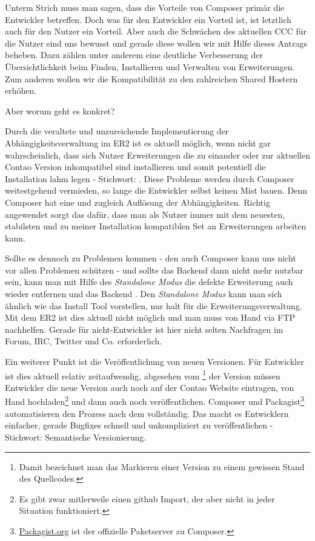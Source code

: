 \documentclass[
paper=a4,
draft=false,%
fontsize=10pt%
]{scrartcl}
\begin{document}
Unterm Strich muss man sagen, dass die Vorteile von Composer primär die Entwickler betreffen. Doch was für den Entwickler ein Vorteil ist, ist letztlich auch für den Nutzer ein Vorteil. Aber auch die Schwächen des aktuellen CCC für die Nutzer sind uns bewusst und gerade diese wollen wir mit Hilfe dieses Antrags beheben. Dazu zählen unter anderem eine deutliche Verbesserung der Übersichtlichkeit beim Finden, Installieren und Verwalten von Erweiterungen. Zum anderen wollen wir die Kompatibilität zu den zahlreichen Shared Hostern erhöhen.

Aber worum geht es konkret?

Durch die veraltete und unzureichende Implementierung der Abhängigkeitsverwaltung im ER2 ist es aktuell möglich, wenn nicht gar wahrscheinlich, dass sich Nutzer Erweiterungen die zu einander oder zur aktuellen Contao Version inkompatibel sind installieren und somit potentiell die Installation lahm legen - Stichwort: . Diese Probleme werden durch Composer weitestgehend vermieden, so lange die Entwickler selbst keinen Mist bauen. Denn Composer hat eine  und zugleich  Auflösung der Abhängigkeiten. Richtig angewendet sorgt das dafür, dass man als Nutzer immer mit dem neuesten, stabilsten und zu meiner Installation kompatiblen Set an Erweiterungen arbeiten kann.

Sollte es dennoch zu Problemen kommen - den auch Composer kann uns nicht vor allen Problemen schützen - und sollte das Backend dann nicht mehr nutzbar sein, kann man mit Hilfe des \textit{Standalone Modus} die defekte Erweiterung auch wieder entfernen und das Backend . Den \textit{Standalone Modus} kann man sich ähnlich wie das Install Tool vorstellen, nur halt für die Erweiterungsverwaltung. Mit dem ER2 ist dies aktuell nicht möglich und man muss von Hand via FTP nachhelfen. Gerade für nicht-Entwickler ist hier nicht selten Nachfragen im Forum, IRC, Twitter und Co. erforderlich.

Ein weiterer Punkt ist die Veröffentlichung von neuen Versionen. Für Entwickler ist dies aktuell relativ zeitaufwendig, abgesehen vom \footnote{Damit bezeichnet man das Markieren einer Version zu einem gewissen Stand des Quellcodes.} der Version müssen Entwickler die neue Version auch noch auf der Contao Website eintragen, von Hand hochladen\footnote{Es gibt zwar mitlerweile einen github Import, der aber nicht in jeder Situation funktioniert.} und dann auch noch veröffentlichen. Composer und Packagist\footnote{\href{https://packagist.org}{Packagist.org} ist der offizielle Paketserver zu Composer.} automatisieren den Prozess nach dem  vollständig. Das macht es Entwicklern einfacher, gerade Bugfixes schnell und unkompliziert zu veröffentlichen - Stichwort: Semantische Versionierung.
\end{document}
